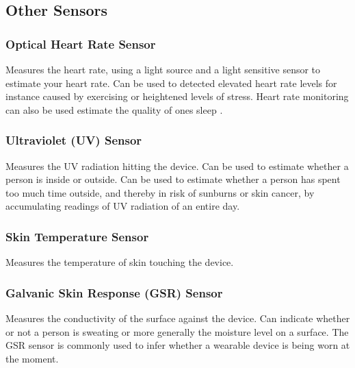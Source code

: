 \subsection{Other Sensors}

\subsubsection{Optical Heart Rate Sensor}
Measures the heart rate, using a light source and a light sensitive sensor to estimate your heart rate. Can be used to detected elevated heart rate levels for instance caused by exercising or heightened levels of stress. Heart rate monitoring can also be used estimate the quality of ones sleep \parencite{guardian_fitness_tracker_rem_sleep}. 

\subsubsection{Ultraviolet (UV) Sensor}
Measures the UV radiation hitting the device. Can be used to estimate whether a person is inside or outside. Can be used to estimate whether a person has spent too much time outside, and thereby in risk of sunburns or skin cancer, by accumulating readings of UV radiation of an entire day.   

\subsubsection{Skin Temperature Sensor}
Measures the temperature of skin touching the device.

\subsubsection{Galvanic Skin Response (GSR) Sensor}
Measures the conductivity of the surface against the device. Can indicate whether or not a person is sweating or more generally the moisture level on a surface. The GSR sensor is commonly used to infer whether a wearable device is being worn at the moment. 